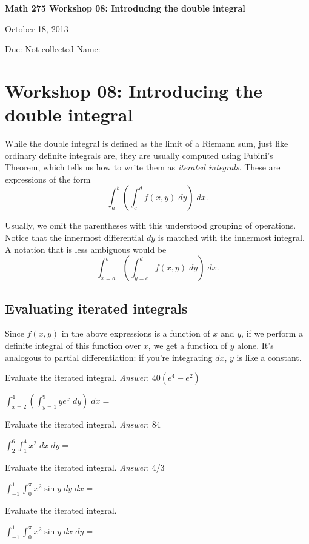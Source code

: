 \documentclass[12pt]{exam}
\theoremstyle{definition}
\begin{document}
\noindent
\textbf{{\large Math 275 \hfill Workshop 08: Introducing the double integral}}

\noindent
October 18, 2013 

\noindent
Due: Not collected \hfill Name: \underline{\hspace{3in}} 

\noindent

\section{Workshop 08: Introducing the double integral}

While the double integral is defined as the limit of a Riemann sum, just
like ordinary definite integrals are, they are usually computed using
Fubini's Theorem, which tells us how to write them as
\emph{iterated integrals}. These are expressions of the form
\[ \int_a^b \left( \int_c^d f(x,y) \; dy \right) \; dx. \]

Usually, we omit the parentheses with this understood grouping of
operations. Notice that the innermost differential $dy$ is matched with
the innermost integral. A notation that is less ambiguous would be
\[ \int_{x=a}^b \left( \int_{y=c}^d f(x,y) \; dy \right) \; dx. \]

\subsection{Evaluating iterated integrals}

Since $f(x,y)$ in the above expressions is a function of $x$ and $y$, if
we perform a definite integral of this function over $x$, we get a
function of $y$ alone. It's analogous to partial differentiation: if
you're integrating $dx$, $y$ is like a constant.

\begin{questions}

\question Evaluate the iterated integral. \emph{Answer}: $40(e^4 - e^2)$

$\displaystyle\int_{x=2}^4 \left( \displaystyle\int_{y=1}^9 ye^x \; dy \right) \; dx = $


\newpage

\question Evaluate the iterated integral. \emph{Answer}: 84

$\displaystyle\int_{2}^{6} \displaystyle\int_{1}^{4} x^2 \; dx \; dy = $




\question Evaluate the iterated integral. \emph{Answer}: 4/3

$\displaystyle\int_{-1}^{1} \displaystyle\int_0^{\pi} x^2 \sin{y} \; dy \; dx = $


\question Evaluate the iterated integral. 

$\displaystyle\int_{-1}^{1} \displaystyle\int_0^{\pi} x^2 \sin{y} \; dx \; dy = $


\end{questions} 
\end{document}
